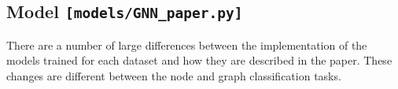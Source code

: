 


\subsection{Model \hfill \texttt{[models/GNN\_paper.py]}}
There are a number of large differences between the implementation of the models trained for each dataset and how they are described in the paper. These changes are different between the node and graph classification tasks. 

